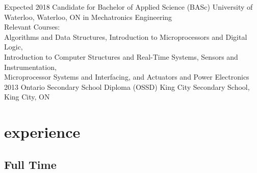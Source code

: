 \documentclass[hidelinks]{kkurucz-cv}
\begin{document}
\begin{entrylist}
\entry
{Expected 2018}
{Candidate for Bachelor of Applied Science (BASc)}
{University of Waterloo, Waterloo, ON}
{{\headingfont in Mechatronics Engineering}}
{\\Relevant Courses:
\\Algorithms and Data Structures, Introduction to Microprocessors and Digital Logic,
\\Introduction to Computer Structures and Real-Time Systems, Sensors and Instrumentation,
\\Microprocessor Systems and Interfacing, and Actuators and Power Electronics}
\entry
{2013}
{Ontario Secondary School Diploma (OSSD)}
{King City Secondary School, King City, ON}
{\null}
{\null}
\end{entrylist}

\vspace{-2mm}
\section{experience}

\subsection{Full Time}
\end{document}
